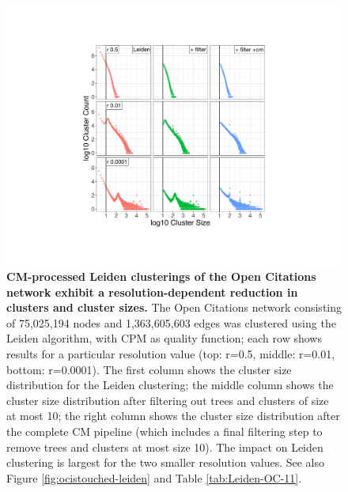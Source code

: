 \documentclass[11pt]{article}   	%
\begin{document}
\begin{figure}[H]
\centering
\includegraphics[width=\linewidth]{figs/fig1_kn.pdf}
\caption{\textbf{CM-processed Leiden clusterings of the Open Citations network exhibit a resolution-dependent reduction in clusters and cluster sizes.}
The Open Citations network consisting of 75,025,194 nodes and 1,363,605,603 edges was clustered using the Leiden algorithm,
with CPM as quality function; each row shows results for a particular resolution value (top: r=0.5, middle: r=0.01, bottom: r=0.0001).
The first column shows the cluster size distribution for the Leiden clustering; the middle column shows the cluster size distribution after filtering out trees and clusters of size at most 10; the right column shows the cluster size distribution after the complete CM pipeline (which includes a final filtering step to remove trees and clusters at most size 10).
The impact on Leiden clustering is largest for the two smaller resolution values.
See also    Figure \ref{fig:ocistouched-leiden} and Table \ref{tab:Leiden-OC-11}.}
\label{fig:oc_size_count_plots_leiden}
\end{figure}
\end{document}
